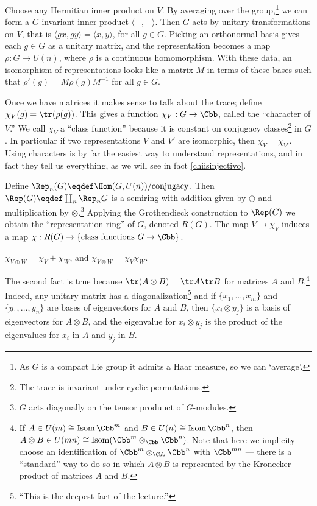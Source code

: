 Choose any Hermitian inner product on $V$.  By averaging over the group,\footnote{As $G$ is a compact Lie group it admits a Haar measure, so we can `average'.} we can form a $G$-invariant inner product $\langle - , - \rangle$. Then $G$ acts by unitary transformations on $V$, that is $\langle gx, gy \rangle = \langle x, y \rangle$, for all $g\in G$.  Picking an orthonormal basis gives each $g\in G$ as a unitary matrix, and the representation becomes a map $\rho: G \to U(n)$, where $\rho$ is a continuous homomorphism.  With these data, an isomorphism of representations looks like a matrix $M$ in terms of these bases such that $\rho'(g) = M \rho(g) M^{-1}$ for all $g \in G$.

Once we have matrices it makes sense to talk about the trace; define $\chi_V(g) = \tr(\rho(g))$.  This gives a function $\chi_V: G \to \Cbb$, called the ``character of $V$.''  We call $\chi_V$ a ``class function'' because it is constant on conjugacy classes\footnote{The trace is invariant under cyclic permutations.} in $G$.  In particular if two representations $V$ and $V'$ are isomorphic, then $\chi_V = \chi_{V'}$.
Using characters is by far the easiest way to understand representations, and in fact they tell us everything, as we will see in fact \ref{chiisinjectivo}.

Define $\Rep_n(G) \eqdef \Hom(G, U(n)) /\textup{conjugacy}$.  Then $\Rep(G) \eqdef \coprod_n \Rep_n G$ is a semiring with addition given by $\oplus$ and multiplication by $\otimes$.\footnote{$G$ acts diagonally on the tensor produuct of $G$-modules.} Applying the Grothendieck construction to $\Rep(G)$ we obtain the ``representation ring'' of $G$, denoted $R(G)$.  The map $V \to \chi_V$ induces a map $\chi: R(G) \to \{\hbox{class functions $G \to \Cbb$}\}$.

\begin{fact}
$\chi_{V \oplus W} = \chi_V + \chi_W$, and $\chi_{V \otimes W} = \chi_V \chi_W$.
\end{fact}
The second fact is true because $\tr(A \otimes B) = \tr A \tr B$ for matrices $A$ and $B$.\footnote{If $A \in U(m) \cong \operatorname{Isom} \Cbb^m$ and $B \in U(n) \cong \operatorname{Isom} \Cbb^n$, then $A \otimes B \in U(mn) \cong \operatorname{Isom} (\Cbb^m \otimes_\Cbb \Cbb^n)$. Note that here we implicity choose an identification of $\Cbb^m\otimes_\Cbb\Cbb^n$ with $\Cbb^{mn}$ --- there is a ``standard'' way to do so in which $A\otimes B$ is represented by the Kronecker product of matrices $A$ and $B$.}  Indeed, any unitary matrix has a diagonalization\footnote{``This is the deepest fact of the lecture.''} and if $\{x_1, \ldots, x_m\}$ and $\{y_1, \ldots, y_n\}$ are bases of eigenvectors for $A$ and $B$, then $\{x_i \otimes y_j\}$ is a basis of eigenvectors for $A \otimes B$, and the eigenvalue for $x_i \otimes y_j$ is the product of the eigenvalues for $x_i$ in $A$ and $y_j$ in $B$.


